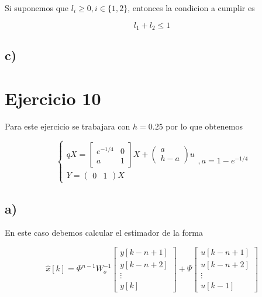 \documentclass[11pt,a4paper]{article}
\newcommand{\siseq}[1]{ \left\{ \begin{array}{c}
    #1
\end{array} \right. }
\begin{document}
    Si suponemos que $l_i \geq 0, i \in \{1, 2\}$, entonces la condicion a cumplir es 

    \begin{equation}
        l_1 + l_2 \leq 1
    \end{equation}

    \subsection*{c)}


    \section*{Ejercicio 10}


        Para este ejercicio se trabajara con $h=0.25$ por lo que obtenemos 

        \begin{equation}
            \siseq{
                qX = 
                \begin{bmatrix}
                    e^{-1/4} & 0 \\
                    a & 1 
                \end{bmatrix} X 
                + 
                \begin{pmatrix}
                    a \\ h - a
                \end{pmatrix} u \\
                Y = 
                \begin{pmatrix}
                    0 & 1
                \end{pmatrix}X
            }, a = 1 - e^{-1/4}
        \end{equation}

    \subsection*{a)}

        En este caso debemos calcular el estimador de la forma 
        
        \begin{equation}
            \hat{x}[k] = \Phi^{n-1}W_o^{-1} 
            \begin{bmatrix}
                y[k - n + 1] \\ 
                y[k - n + 2] \\ 
                \vdots \\
                y[k]
            \end{bmatrix}
            + \Psi 
            \begin{bmatrix}
                u[k - n + 1] \\ 
                u[k - n + 2] \\ 
                \vdots \\ 
                u[k-1] 
            \end{bmatrix}
        \end{equation}
\end{document}
